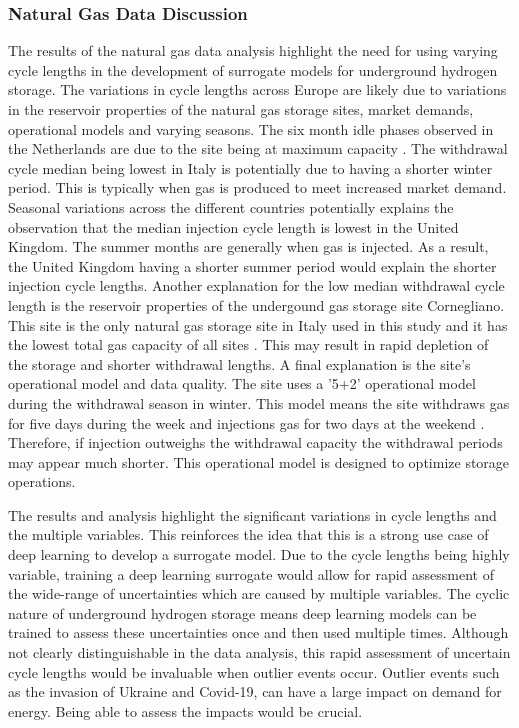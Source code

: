 \subsubsection{Natural Gas Data Discussion}
The results of the natural gas data analysis highlight the need for using varying cycle lengths in the development of surrogate models for underground hydrogen storage. The variations in cycle lengths across Europe are likely due to variations in the reservoir properties of the natural gas storage sites, market demands, operational models and varying seasons. The six month idle phases observed in the Netherlands are due to the site being at maximum capacity \citep{AGSI_data}. The withdrawal cycle median being lowest in Italy is potentially due to having a shorter winter period. This is typically  when gas is produced to meet increased market demand. Seasonal variations across the different countries potentially explains the observation that the median injection cycle length is lowest in the United Kingdom. The summer months are generally when gas is injected. As a result, the United Kingdom having a shorter summer period would explain the shorter injection cycle lengths. Another explanation for the low median withdrawal cycle length is the reservoir properties of the undergound gas storage site Cornegliano. This site is the only natural gas storage site in Italy used in this study and it has the lowest total gas capacity of all sites \citep{AGSI_data}. This may result in rapid depletion of the storage and shorter withdrawal lengths. A final explanation is the site's operational model and data quality. The site uses a '5+2' operational model during the withdrawal season in winter. This model means the site withdraws gas for five days during the week and injections gas for two days at the weekend \citep{Italy_UGS}. Therefore, if injection outweighs the withdrawal capacity the withdrawal periods may appear much shorter. This operational model is designed to optimize storage operations. 

The results and analysis highlight the significant variations in cycle lengths and the multiple variables. This reinforces the idea that this is a strong use case of deep learning to develop a surrogate model. Due to the cycle lengths being highly variable, training a deep learning surrogate would allow for rapid assessment of the wide-range of uncertainties which are caused by multiple variables. The cyclic nature of underground hydrogen storage means deep learning models can be trained to assess these uncertainties once and then used multiple times. Although not clearly distinguishable in the data analysis, this rapid assessment of uncertain cycle lengths would be invaluable when outlier events occur. Outlier events such as the invasion of Ukraine and Covid-19, can have a large impact on demand for energy. Being able to assess the impacts would be crucial. 

